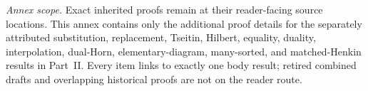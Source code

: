\label{annex:p02}
\noindent\textit{Annex scope.}  Exact inherited proofs remain at their
reader-facing source locations.  This annex contains only the additional proof
details for the separately attributed substitution, replacement, Tseitin,
Hilbert, equality, duality,
interpolation, dual-Horn, elementary-diagram, many-sorted, and matched-Henkin
results in Part~II.  Every item links to exactly one body result; retired
combined drafts and overlapping historical proofs are not on the reader route.








